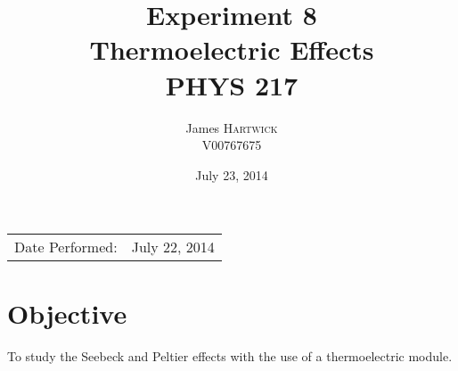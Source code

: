\documentclass{article}
\title{Experiment 8 \\ Thermoelectric Effects \\ PHYS 217} %
\author{James \textsc{Hartwick}\\ V00767675} %
\date{July 23, 2014} %
\begin{document}
\maketitle %

\begin{center}
\begin{tabular}{l r}
Date Performed: & July 22, 2014 \\ %
\end{tabular}
\end{center}



\section{Objective}

To study the Seebeck and Peltier effects with the use of a thermoelectric module.



\end{document}
